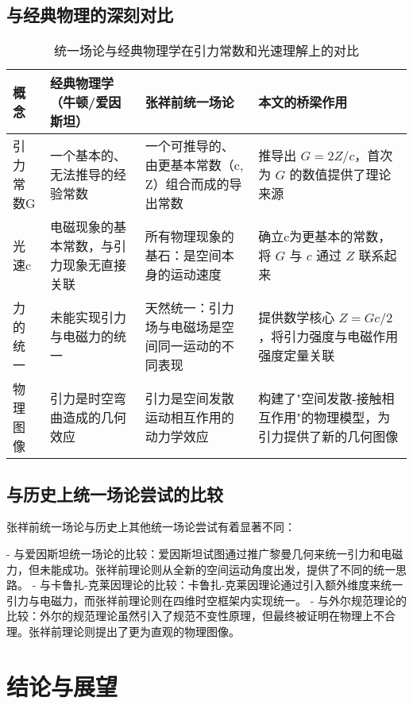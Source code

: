\documentclass[12pt,a4paper]{article}
\begin{document}
\subsection{与经典物理的深刻对比}
\label{subsection:comparison_classical_physics}

\begin{table}[H]
\centering
\caption{统一场论与经典物理学在引力常数和光速理解上的对比}
\label{table:comparison_classical_physics}
\begin{tabular}{|l|l|l|l|}
\hline
\textbf{概念} & \textbf{经典物理学（牛顿/爱因斯坦）} & \textbf{张祥前统一场论} & \textbf{本文的桥梁作用} \\
\hline
引力常数G & 一个基本的、无法推导的经验常数 & 一个可推导的、由更基本常数（c, Z）组合而成的导出常数 & 推导出 $G = 2Z/c$，首次为 $G$ 的数值提供了理论来源 \\
光速c & 电磁现象的基本常数，与引力现象无直接关联 & 所有物理现象的基石：是空间本身的运动速度 & 确立c为更基本的常数，将 $G$ 与 $c$ 通过 $Z$ 联系起来 \\
力的统一 & 未能实现引力与电磁力的统一 & 天然统一：引力场与电磁场是空间同一运动的不同表现 & 提供数学核心 $Z = G c/2$，将引力强度与电磁作用强度定量关联 \\
物理图像 & 引力是时空弯曲造成的几何效应 & 引力是空间发散运动相互作用的动力学效应 & 构建了"空间发散-接触相互作用"的物理模型，为引力提供了新的几何图像 \\
\hline
\end{tabular}
\end{table}

\subsection{与历史上统一场论尝试的比较}
\label{subsection:comparison_unified_theories}

张祥前统一场论与历史上其他统一场论尝试有着显著不同：

- 与爱因斯坦统一场论的比较：爱因斯坦试图通过推广黎曼几何来统一引力和电磁力，但未能成功。张祥前理论则从全新的空间运动角度出发，提供了不同的统一思路。
- 与卡鲁扎-克莱因理论的比较：卡鲁扎-克莱因理论通过引入额外维度来统一引力与电磁力，而张祥前理论则在四维时空框架内实现统一。
- 与外尔规范理论的比较：外尔的规范理论虽然引入了规范不变性原理，但最终被证明在物理上不合理。张祥前理论则提出了更为直观的物理图像。

\section{结论与展望}
\label{section:conclusion_future}
\end{document}
